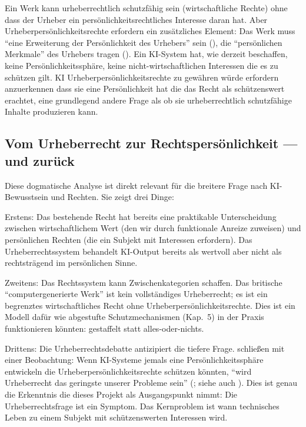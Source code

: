 \documentclass[acmlarge, noacm]{acmart}
\begin{document}
Ein Werk kann urheberrechtlich schutzfähig sein (wirtschaftliche Rechte) ohne dass der Urheber ein persönlichkeitsrechtliches Interesse daran hat. Aber Urheberpersönlichkeitsrechte erfordern ein zusätzliches Element: Das Werk muss ``eine Erweiterung der Persönlichkeit des Urhebers'' sein (\cite{rigamonti2006}), die ``persönlichen Merkmale'' des Urhebers tragen (\cite{rosenthal_kwall2010}). Ein KI-System hat, wie derzeit beschaffen, keine Persönlichkeitssphäre, keine nicht-wirtschaftlichen Interessen die es zu schützen gilt. KI Urheberpersönlichkeitsrechte zu gewähren würde erfordern anzuerkennen dass sie eine Persönlichkeit hat die das Recht als schützenswert erachtet, eine grundlegend andere Frage als ob sie urheberrechtlich schutzfähige Inhalte produzieren kann.

\subsection{Vom Urheberrecht zur Rechtspersönlichkeit --- und zurück}

Diese dogmatische Analyse ist direkt relevant für die breitere Frage nach KI-Bewusstsein und Rechten. Sie zeigt drei Dinge:

Erstens: Das bestehende Recht hat bereits eine praktikable Unterscheidung zwischen wirtschaftlichem Wert (den wir durch funktionale Anreize zuweisen) und persönlichen Rechten (die ein Subjekt mit Interessen erfordern). Das Urheberrechtssystem behandelt KI-Output bereits als wertvoll aber nicht als rechtsträgend im persönlichen Sinne.

Zweitens: Das Rechtssystem kann Zwischenkategorien schaffen. Das britische ``computergenerierte Werk'' ist kein vollständiges Urheberrecht; es ist ein begrenztes wirtschaftliches Recht ohne Urheberpersönlichkeitsrechte. Dies ist ein Modell dafür wie abgestufte Schutzmechanismen (Kap.~5) in der Praxis funktionieren könnten: gestaffelt statt alles-oder-nichts.

Drittens: Die Urheberrechtsdebatte antizipiert die tiefere Frage. \citet{miernicki2021} schließen mit einer Beobachtung: Wenn KI-Systeme jemals eine Persönlichkeitssphäre entwickeln die Urheberpersönlichkeitsrechte schützen könnten, ``wird Urheberrecht das geringste unserer Probleme sein'' (\cite{grimmelmann2016}; siehe auch \cite{clifford1997}). Dies ist genau die Erkenntnis die dieses Projekt als Ausgangspunkt nimmt: Die Urheberrechtsfrage ist ein Symptom. Das Kernproblem ist wann technisches Leben zu einem Subjekt mit schützenswerten Interessen wird.
\end{document}
